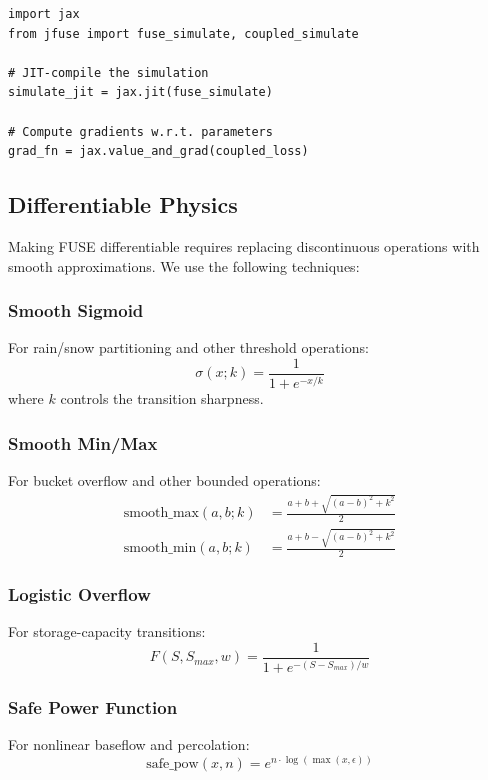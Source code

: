 \documentclass[11pt,a4paper]{article}
\begin{document}
\begin{lstlisting}
import jax
from jfuse import fuse_simulate, coupled_simulate

# JIT-compile the simulation
simulate_jit = jax.jit(fuse_simulate)

# Compute gradients w.r.t. parameters
grad_fn = jax.value_and_grad(coupled_loss)
\end{lstlisting}

\subsection{Differentiable Physics}

Making FUSE differentiable requires replacing discontinuous operations with smooth approximations. We use the following techniques:

\subsubsection{Smooth Sigmoid}
For rain/snow partitioning and other threshold operations:
\begin{equation}
    \sigma(x; k) = \frac{1}{1 + e^{-x/k}}
\end{equation}
where $k$ controls the transition sharpness.

\subsubsection{Smooth Min/Max}
For bucket overflow and other bounded operations:
\begin{align}
    \text{smooth\_max}(a, b; k) &= \frac{a + b + \sqrt{(a-b)^2 + k^2}}{2} \\
    \text{smooth\_min}(a, b; k) &= \frac{a + b - \sqrt{(a-b)^2 + k^2}}{2}
\end{align}

\subsubsection{Logistic Overflow}
For storage-capacity transitions:
\begin{equation}
    F(S, S_{max}, w) = \frac{1}{1 + e^{-(S - S_{max})/w}}
\end{equation}

\subsubsection{Safe Power Function}
For nonlinear baseflow and percolation:
\begin{equation}
    \text{safe\_pow}(x, n) = e^{n \cdot \log(\max(x, \epsilon))}
\end{equation}
\end{document}
